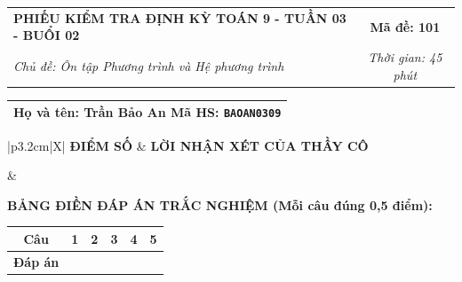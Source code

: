 \documentclass[12pt,a4paper]{article}
\begin{document}
\pagestyle{empty}



\noindent
\begin{tabularx}{\linewidth}{|X|c|}
\hline
\textbf{PHIẾU KIỂM TRA ĐỊNH KỲ TOÁN 9 - TUẦN 03 - BUỔI 02} & \textbf{Mã đề: 101} \\
\textit{Chủ đề: Ôn tập Phương trình và Hệ phương trình} & \textit{Thời gian: 45 phút} \\
\hline
\end{tabularx}

\vspace{1mm}

\noindent
\begin{tabularx}{\linewidth}{|X|}
\hline
\rule[-2mm]{0pt}{7.5mm}\textbf{Họ và tên:} \textbf{\large Trần Bảo An} \hfill \textbf{Mã HS:} \texttt{BAOAN0309} \quad \\
\hline
\end{tabularx}

\vspace{1mm}

\noindent
\begin{tabularx}{\linewidth}{|p{3.2cm}|X|}
\hline
\centering\textbf{ĐIỂM SỐ} & \centering\textbf{LỜI NHẬN XÉT CỦA THẦY CÔ} \tabularnewline
\hline
\rule{0pt}{1.3cm} & \tabularnewline
\hline
\end{tabularx}

\vspace{1.2mm}

\noindent\textbf{BẢNG ĐIỀN ĐÁP ÁN TRẮC NGHIỆM (Mỗi câu đúng 0,5 điểm):}
\vspace{0.8mm}

\noindent
\renewcommand{\arraystretch}{1.35}
\begin{tabularx}{\linewidth}{|c|*{5}{>{\centering\arraybackslash}X|}}
\hline
\textbf{Câu} & \textbf{1} & \textbf{2} & \textbf{3} & \textbf{4} & \textbf{5} \\
\hline
\textbf{Đáp án} & & & & & \\
\hline
\end{tabularx}
\renewcommand{\arraystretch}{1.0}

\vspace{1.5mm}
\end{document}
